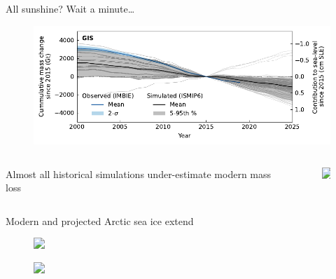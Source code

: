 \documentclass[hide notes,intlimits]{beamer}
\begin{document}
\begin{frame}{All sunshine? Wait a minute\ldots}
  \begin{figure}
    \includegraphics[width=\textwidth]{GIS_hist_with_obs}
  \end{figure}
  \begin{columns}[c]
    \begin{column}{.5\textwidth}
      \begin{minipage}[t][.5\textheight][t]{\textwidth}
        \alert{Almost all historical simulations under-estimate modern mass loss}
      \end{minipage}
    \end{column}
    \begin{column}{.25\textwidth}
      \begin{minipage}[t][.5\textheight][t]{\textwidth}
        \begin{figure}
          \includegraphics<2>[width=1.8cm]{brain_thinking}
        \end{figure}
      \end{minipage}
    \end{column}
  \end{columns}
\end{frame}


\begin{frame}{Modern and projected Arctic sea ice extend}
  \begin{minipage}[t][1.25cm][t]{\textwidth}
    \begin{figure}
      \includegraphics<1->[width=1cm]{brain_solution}
    \end{figure}
  \end{minipage}
  \vspace{0.25em}
  \begin{minipage}[t][6.25cm][b]{\textwidth}
    \begin{figure}
          \includegraphics<2>[height=6cm]{grl23061-fig-0001}
    \end{figure}
  \end{minipage}
\end{frame}
\end{document}
